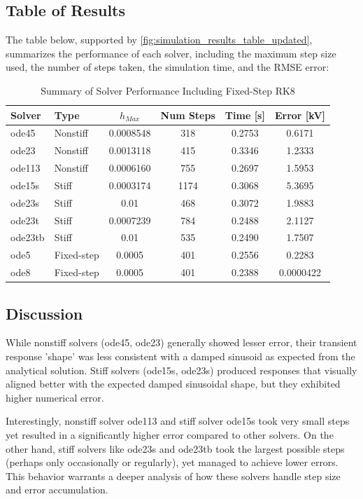\subsection*{Table of Results}
The table below, supported by \cref{fig:simulation_results_table_updated}, summarizes the performance of each solver, including the maximum step size used, the number of steps taken, the simulation time, and the RMSE error:

\begin{table}[h!]
    \centering
    \begin{tabular}{|l|l|c|c|c|c|}
        \hline
        \textbf{Solver} & \textbf{Type} & \textbf{$h_{Max}$} & \textbf{Num Steps} & \textbf{Time [s]} & \textbf{Error [kV]} \\
        \hline
        ode45 & Nonstiff & 0.0008548 & 318 & 0.2753 & 0.6171 \\
        ode23 & Nonstiff & 0.0013118 & 415 & 0.3346 & 1.2333 \\
        ode113 & Nonstiff & 0.0006160 & 755 & 0.2697 & 1.5953 \\
        ode15s & Stiff & 0.0003174 & 1174 & 0.3068 & 5.3695 \\
        ode23s & Stiff & 0.01 & 468 & 0.3072 & 1.9883 \\
        ode23t & Stiff & 0.0007239 & 784 & 0.2488 & 2.1127 \\
        ode23tb & Stiff & 0.01 & 535 & 0.2490 & 1.7507 \\
        ode5 & Fixed-step & 0.0005 & 401 & 0.2556 & 0.2283 \\
        ode8 & Fixed-step & 0.0005 & 401 & 0.2388 & 0.0000422 \\
        \hline
    \end{tabular}
    \caption{Summary of Solver Performance Including Fixed-Step RK8}
    \label{tab:solver_performance_updated}
\end{table}

\subsection*{Discussion}
While nonstiff solvers (ode45, ode23) generally showed lesser error, their transient response 'shape' was less consistent with a damped sinusoid as expected from the analytical solution. Stiff solvers (ode15s, ode23s) produced responses that visually aligned better with the expected damped sinusoidal shape, but they exhibited higher numerical error.

Interestingly, nonstiff solver ode113 and stiff solver ode15s took very small steps yet resulted in a significantly higher error compared to other solvers. On the other hand, stiff solvers like ode23s and ode23tb took the largest possible steps (perhaps only occasionally or regularly), yet managed to achieve lower errors. This behavior warrants a deeper analysis of how these solvers handle step size and error accumulation.

